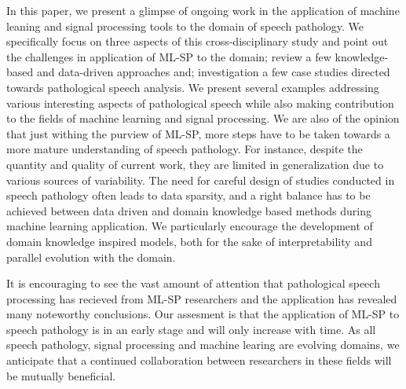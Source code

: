 \documentclass{article}
\begin{document}
In this paper, we present a glimpse of ongoing work in the application of machine leaning and signal processing tools to the domain of speech pathology.
We specifically focus on three aspects of this cross-disciplinary study and point out the challenges in application of ML-SP to the domain; review a few knowledge-based and data-driven approaches and; investigation a few case studies directed towards pathological speech analysis.
We present several examples addressing various interesting aspects of pathological speech while also making contribution to the fields of machine learning and signal processing. 
We are also of the opinion that just withing the purview of ML-SP, more steps have to be taken towards a more mature understanding of speech pathology. 
For instance, despite the quantity and quality of current work, they are limited in generalization due to various sources of variability.
The need for careful design of studies conducted in speech pathology often leads to data sparsity, and a right balance has to be achieved between data driven and domain knowledge based methods during machine learning application.
We particularly encourage the development of domain knowledge inspired models, both for the sake of interpretability and parallel evolution with the domain. 

It is encouraging to see the vast amount of attention that pathological speech processing has recieved from ML-SP researchers and the application has revealed many noteworthy conclusions.
Our assesment is that the application of ML-SP to speech pathology is in an early stage and will only increase with time.
As all speech pathology, signal processing and machine learing are evolving domains, we anticipate that a continued collaboration between researchers in these fields will be mutually beneficial.

\begin{spacing}{.84}
\vfill\pagebreak




\end{spacing}
\end{document}
